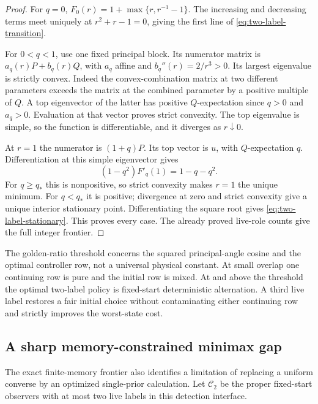 \begin{proof}
For $q=0$, $F_0(r)=1+\max\{r,r^{-1}-1\}$. The increasing and decreasing terms meet uniquely at $r^2+r-1=0$, giving the first line of \eqref{eq:two-label-transition}.

For $0<q<1$, use one fixed principal block. Its numerator matrix is $a_q(r)P+b_q(r)Q$, with $a_q$ affine and $b_q''(r)=2/r^3>0$. Its largest eigenvalue is strictly convex. Indeed the convex-combination matrix at two different parameters exceeds the matrix at the combined parameter by a positive multiple of $Q$. A top eigenvector of the latter has positive $Q$-expectation since $q>0$ and $a_q>0$. Evaluation at that vector proves strict convexity. The top eigenvalue is simple, so the function is differentiable, and it diverges as $r\downarrow0$.

At $r=1$ the numerator is $(1+q)P$. Its top vector is $u$, with $Q$-expectation $q$. Differentiation at this simple eigenvector gives
\[
 (1-q^2)F'_q(1)=1-q-q^2.
\]
For $q\ge q_*$ this is nonpositive, so strict convexity makes $r=1$ the unique minimum. For $q<q_*$ it is positive; divergence at zero and strict convexity give a unique interior stationary point. Differentiating the square root gives \eqref{eq:two-label-stationary}. This proves every case. The already proved live-role counts give the full integer frontier.
\end{proof}

The golden-ratio threshold concerns the squared principal-angle cosine and the optimal controller row, not a universal physical constant. At small overlap one continuing row is pure and the initial row is mixed. At and above the threshold the optimal two-label policy is fixed-start deterministic alternation. A third live label restores a fair initial choice without contaminating either continuing row and strictly improves the worst-state cost.

\subsection{A sharp memory-constrained minimax gap}
The exact finite-memory frontier also identifies a limitation of replacing a uniform converse by an optimized single-prior calculation. Let $\mathcal C_2$ be the proper fixed-start observers with at most two live labels in this detection interface.

